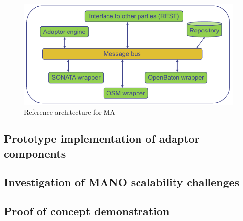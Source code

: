 \begin{figure}[h]
	\centering
	\includegraphics[width=0.9\linewidth]{figures/wp3Arch}
	\caption{Reference architecture for MA}
	\label{fig:wp3arch}
\end{figure}

\subsection{Prototype implementation of adaptor components}
\subsection{Investigation of MANO scalability challenges}
\subsection{Proof of concept demonstration}
